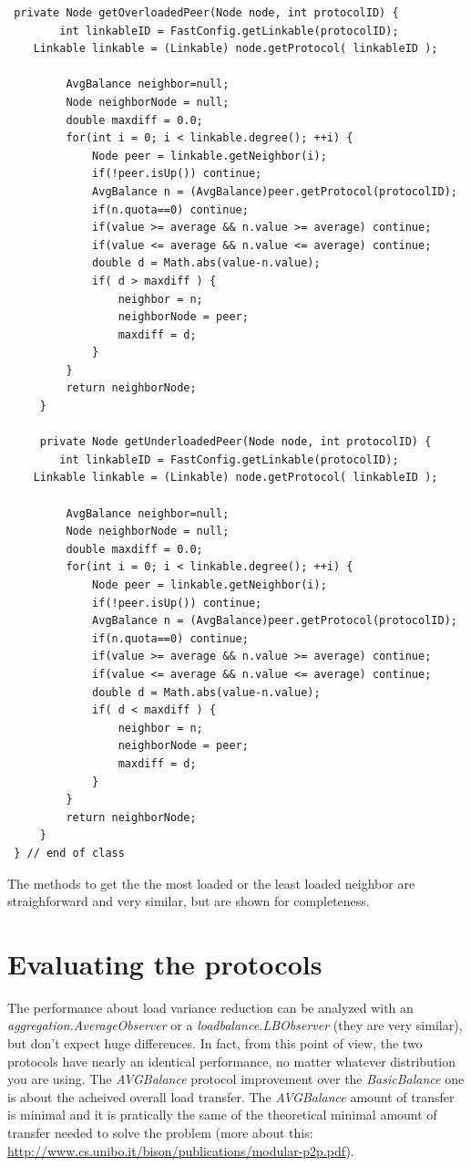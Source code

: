 \documentclass[a4paper,11pt]{article}
\begin{document}
\footnotesize
\begin{verbatim}
 private Node getOverloadedPeer(Node node, int protocolID) {
        int linkableID = FastConfig.getLinkable(protocolID);
	Linkable linkable = (Linkable) node.getProtocol( linkableID );
	
         AvgBalance neighbor=null;
         Node neighborNode = null;
         double maxdiff = 0.0;
         for(int i = 0; i < linkable.degree(); ++i) {
             Node peer = linkable.getNeighbor(i); 
             if(!peer.isUp()) continue;
             AvgBalance n = (AvgBalance)peer.getProtocol(protocolID);
             if(n.quota==0) continue;
             if(value >= average && n.value >= average) continue;
             if(value <= average && n.value <= average) continue;
             double d = Math.abs(value-n.value); 
             if( d > maxdiff ) {
                 neighbor = n;
                 neighborNode = peer;
                 maxdiff = d;
             }
         }
         return neighborNode;
     } 
 
     private Node getUnderloadedPeer(Node node, int protocolID) {
        int linkableID = FastConfig.getLinkable(protocolID);
	Linkable linkable = (Linkable) node.getProtocol( linkableID );
     
         AvgBalance neighbor=null;
         Node neighborNode = null;
         double maxdiff = 0.0;
         for(int i = 0; i < linkable.degree(); ++i) {
             Node peer = linkable.getNeighbor(i);
             if(!peer.isUp()) continue;
             AvgBalance n = (AvgBalance)peer.getProtocol(protocolID);
             if(n.quota==0) continue;
             if(value >= average && n.value >= average) continue;
             if(value <= average && n.value <= average) continue;
             double d = Math.abs(value-n.value); 
             if( d < maxdiff ) {
                 neighbor = n;
                 neighborNode = peer;
                 maxdiff = d;
             }
         }
         return neighborNode;
     } 
 } // end of class
\end{verbatim}
\normalsize


The methods to get the the most loaded or the least loaded neighbor
are straighforward and very similar, but are shown for completeness.


\section{Evaluating the protocols}

The performance about load variance reduction can be analyzed with
an \emph{aggregation.AverageObserver} or a \emph{loadbalance.LBObserver}
(they are very similar), but don't expect huge differences. In fact,
from this point of view, the two protocols have nearly an identical
performance, no matter whatever distribution you are using. The 
\emph{AVGBalance}
protocol improvement over the \emph{BasicBalance} one is about the
acheived overall load transfer. The \emph{AVGBalance} amount of transfer
is minimal and it is pratically the same of the theoretical minimal
amount of transfer needed to solve the problem 
(more about this: \url{http://www.cs.unibo.it/bison/publications/modular-p2p.pdf}). 
\end{document}
